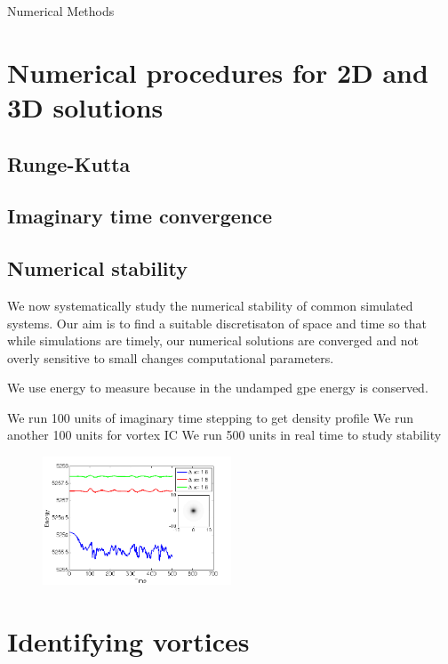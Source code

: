 \begin{chapter}{\label{cha:numerics}Numerical Methods}
\section{\label{section:RK} Numerical procedures for 2D and 3D solutions}
	\subsection{\label{section:RK4} Runge-Kutta}
	\subsection{\label{section:imagTime} Imaginary time convergence}
	\subsection{\label{section:numericalParams} Numerical stability}
	We now systematically study the numerical stability of common simulated systems. Our aim is to find a suitable discretisaton of space and time so that while simulations are timely, our numerical solutions are converged and not overly sensitive to small changes computational parameters.

	We use energy to measure because in the undamped gpe energy is conserved.

	We run 100 units of imaginary time stepping to get density profile
	We run another 100 units for vortex IC
	We run 500 units in real time to study stability


\begin{figure}
	\centering
	\includegraphics[width=0.5\textwidth]{numerics/figures/homg_energy_cons.png}
\end{figure}

\section{\label{section:vortexidentifying} Identifying vortices}


\end{chapter}
